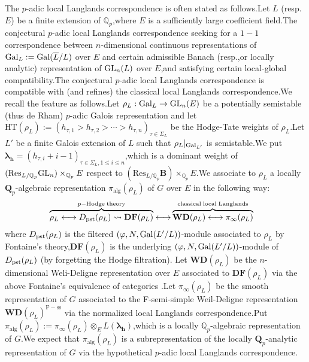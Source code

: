 \documentclass[SecEq,CM,GP]{degruyter-crelle} %
\theoremstyle{plain}
\newcommand{\df}{{\mathbf{DF}}}
\newcommand{\gal}{{\rm Gal}}
\newcommand{\GLN}{{\rm GL}}
\newcommand{\pst}{{\rm pst}}
\newcommand{\wdre}{{\textbf{WD}}}
\newcommand{\BQ}{{\mathbb{Q}}}
\newcommand{\bB}{{\mathbf{B}}}
\newcommand{\bQ}{{\mathbf{Q}}}
\newcommand{\bh}{{\mathbf{h}}}
\begin{document}
The $p$-adic local Langlands correspondence is often stated as follows.\;Let $L$ (resp.\;$E$) be a finite extension of $\BQ_p$,\;where $E$ is a sufficiently large coefficient field.\;The conjectural $p$-adic local Langlands correspondence  seeking for a $1-1$ correspondence between $n$-dimensional continuous representations  of $\gal_L:=\gal(\overline{L}/L)$ over $E$  and certain admissible Banach (resp.,\;or locally analytic) representation of $\GLN_n(L)$ over $E$,\;and satisfying certain local-global compatibility.\;The conjectural $p$-adic local Langlands correspondence is compatible with (and refines) the classical local Langlands correspondence.\;We recall the feature as follows.\;Let $\rho_L:\gal_L\rightarrow \GLN_n(E)$ be a potentially semistable (thus de Rham) $p$-adic Galois representation and let $\mathrm{HT}(\rho_L):=(h_{\tau,1}>h_{\tau,2}>\cdots>h_{\tau,n} )_{\tau\in \Sigma_L}$ be the Hodge-Tate weights of $\rho_L$.\;Let $L'$ be a finite Galois extension of $L$ such that $\rho_L|_{\gal_{L'}}$ is semistable.\;We put ${\bm\lambda}_\bh=(h_{\tau,i}+i-1)_{\tau\in \Sigma_L,1\leq i\leq n}$,\;which is a  dominant weight of $(\mathrm{Res}_{L/\BQ_p}\GLN_n)\times_{\BQ_p}E$ respect to $(\mathrm{Res}_{L/\BQ_p}\bB)\times_{\BQ_p}E$.\;We associate to $\rho_L$ a locally $\bQ_p$-algebraic representation $\pi_{\mathrm{alg}}(\rho_L)$ of $G$ over $E$ in the following way:
\begin{equation}\label{assoWD}
\begin{aligned}
	\overbrace{\rho_L\longleftrightarrow D_{\pst}(\rho_L)\rightsquigarrow \df(\rho_L)}^{p-\text{Hodge\;theory}}\longleftrightarrow &\overbrace{\wdre(\rho_L)\longleftrightarrow\pi_\infty(\rho_L)}^{\text{classical\;local\;Langlands}}
\end{aligned}
\end{equation}
where $D_{\pst}(\rho_L)$ is the filtered $(\varphi,N,\gal(L'/L))$-module associated to $\rho_L$ by Fontaine's theory,\;$\df(\rho_L)$ is the underlying $(\varphi,N,\gal(L'/L))$-module of $D_{\pst}(\rho_L)$ (by forgetting the Hodge filtration). Let $\wdre(\rho_L)$ be the $n$-dimensional Weli-Deligne representation over $E$ associated to $\df(\rho_L)$ via the above Fontaine's equivalence of categories \cite[Proposition 4.1]{breuil2007first}.\;Let $\pi_\infty(\rho_L)$ be the smooth representation of $G$ associated
to the F-semi-simple Weil-Deligne representation $\wdre(\rho_L)^{\mathrm{F-ss}}$ via the normalized local Langlands correspondence.\;Put $\pi_{\mathrm{alg}}(\rho_L):=\pi_\infty(\rho_L)\otimes_EL({\bm\lambda}_\bh)$,\;which is a locally $\BQ_p$-algebraic representation of $G$.\;We expect that $\pi_{\mathrm{alg}}(\rho_L)$ is a subrepresentation of the locally $\bQ_p$-analytic representation of $G$ via the hypothetical $p$-adic local Langlands correspondence.\;
\end{document}
